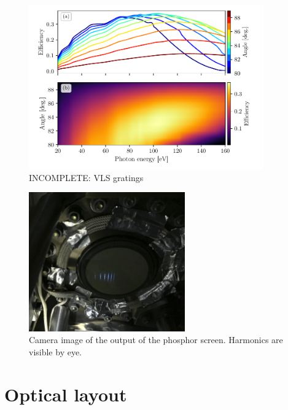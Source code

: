\begin{figure}
	\centering
	\includegraphics[width=0.9\textwidth]{figures/Beamline/grating_efficiency.pdf}
	\caption{INCOMPLETE: VLS gratings}
	\label{fig:grating_efficiency}
\end{figure}

\begin{figure}
	\centering
	\includegraphics[width=0.6\textwidth]{figures/Two_source/MCP_ts_harmonics.png}
	\caption[Image of phosphor output of high harmonics generated from two sources]{Camera image of the output of the phosphor screen.  Harmonics are visible by eye.}
	\label{fig:MCP_ts_harmonics}
\end{figure}



\section{Optical layout}
\label{sec:optical_layout}

